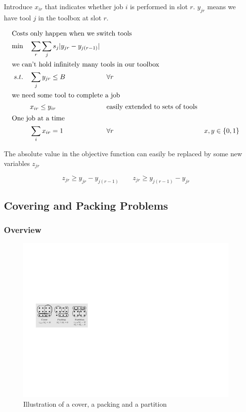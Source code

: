 Introduce $x_{ir}$ that indicates whether job $i$ is performed in slot $r$. $y_{jr}$ means we have tool $j$ in the toolbox at slot $r$.

\begin{align*}
\intertext{Costs only happen when we switch tools}
\min \quad & \sum_r\sum_j s_j|y_{jr}-y_{j(r-1)}|\\
\intertext{we can't hold infinitely many tools in our toolbox}
s.t.\quad	& \sum_j y_{jr} \leq B && \forall r\\
\intertext{we need some tool to complete a job}
	& x_{ir} \leq y_{ir} && \text{easily extended to sets of tools}\\
\intertext{One job at a time}
	& \sum_i x_{ir} = 1 && \forall r
	& x,y\in \{0,1\}
\end{align*}

The absolute value in the objective function can easily be replaced by some new variables $z_{jr}$

\[z_{jr} \geq y_{jr} - y_{j(r-1)} \qquad z_{jr} \geq y_{j(r-1)} - y_{jr}\]

\subsection{Covering and Packing Problems}
\subsubsection{Overview}
\begin{figure}[htbp]
\begin{center}
\includegraphics{images/coverpackingpartition}
\caption{Illustration of a cover, a packing and a partition}
\label{fig:coverpackingpartition}
\end{center}
\end{figure}

